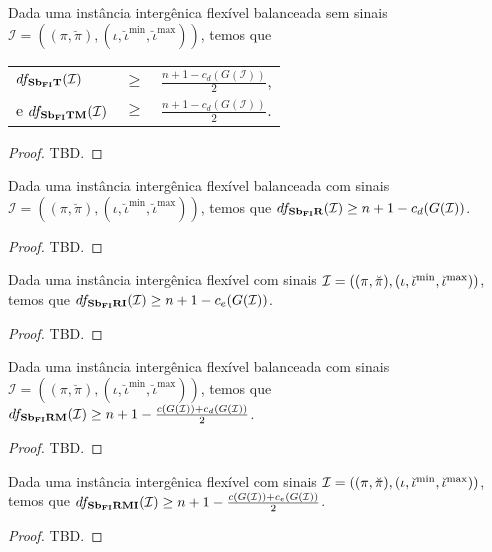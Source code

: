 \begin{theorem}\label{theorem:PQQUYBMS}
Dada uma instância intergênica flexível balanceada sem sinais $\mathcal{I} = ((\pi,\breve\pi),(\iota,\breve\iota^{\min},\breve\iota^{\max}))$, temos que

\begin{tabular}{lll}
  $df_{\textbf{Sb\textsubscript{FI}T}}(\mathcal{I})$      & $ \ge $ & $\frac{{n+1} - c_d(G(\mathcal{I} ))}{2}$, \\
  e $df_{\textbf{Sb\textsubscript{FI}TM}}(\mathcal{I})$   & $ \ge $ & $\frac{{n+1} - c_d(G(\mathcal{I} ))}{2}$. \\
\end{tabular}
\end{theorem}
\begin{proof}
TBD.
\end{proof}


\begin{theorem}\label{theorem:EUNBEQEX}
Dada uma instância intergênica flexível balanceada com sinais $\mathcal{I} = ((\pi,\breve\pi),(\iota,\breve\iota^{\min},\breve\iota^{\max}))$, temos que $df_{\textbf{Sb\textsubscript{FI}R}}(\mathcal{I}) \ge {n+1} - c_d(G(\mathcal{I} ))$.
\end{theorem}
\begin{proof}
TBD.
\end{proof}

\begin{theorem}\label{theorem:SZNBDWOM}
Dada uma instância intergênica flexível com sinais $\mathcal{I} = ((\pi,\breve\pi),(\iota,\breve\iota^{\min},\break\breve\iota^{\max}))$, temos que $df_{\textbf{Sb\textsubscript{FI}RI}}(\mathcal{I}) \ge {n+1} - c_e(G(\mathcal{I} ))$.
\end{theorem}
\begin{proof}
TBD.
\end{proof}

\begin{theorem}\label{theorem:CNMFNKPK}
Dada uma instância intergênica flexível balanceada com sinais $\mathcal{I} = ((\pi,\breve\pi),(\iota,\breve\iota^{\min},\breve\iota^{\max}))$, temos que $df_{\textbf{Sb\textsubscript{FI}RM}}(\mathcal{I}) \ge {n+1} - \frac{c(G(\mathcal{I} )) + c_d(G(\mathcal{I} ))}{2}$.
\end{theorem}
\begin{proof}
TBD.
\end{proof}

\begin{theorem}\label{theorem:XQPRYMFX}
Dada uma instância intergênica flexível com sinais $\mathcal{I} = ((\pi,\breve\pi),(\iota,\breve\iota^{\min},\break\breve\iota^{\max}))$, temos que $df_{\textbf{Sb\textsubscript{FI}RMI}}(\mathcal{I}) \ge {n+1} - \frac{c(G(\mathcal{I} )) + c_e(G(\mathcal{I} ))}{2}$.
\end{theorem}
\begin{proof}
TBD.
\end{proof}

